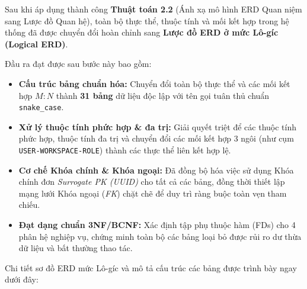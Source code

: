




Sau khi áp dụng thành công \textbf{Thuật toán 2.2} (Ánh xạ mô hình ERD Quan niệm sang Lược đồ Quan hệ), toàn bộ thực thể, thuộc tính và mối kết hợp trong hệ thống đã được chuyển đổi hoàn chỉnh sang \textbf{Lược đồ ERD ở mức Lô-gíc (Logical ERD)}.

Đầu ra đạt được sau bước này bao gồm:
\begin{itemize}
    \item \textbf{Cấu trúc bảng chuẩn hóa:} Chuyển đổi toàn bộ thực thể và các mối kết hợp $M:N$ thành \textbf{31 bảng} dữ liệu độc lập với tên gọi tuân thủ chuẩn \texttt{snake\_case}.
    \item \textbf{Xử lý thuộc tính phức hợp \& đa trị:} Giải quyết triệt để các thuộc tính phức hợp, thuộc tính đa trị và chuyển đổi các mối kết hợp 3 ngôi (như cụm \texttt{USER-WORKSPACE-ROLE}) thành các thực thể liên kết hợp lệ.
    \item \textbf{Cơ chế Khóa chính \& Khóa ngoại:} Đã đồng bộ hóa việc sử dụng Khóa chính đơn \textit{Surrogate PK (UUID)} cho tất cả các bảng, đồng thời thiết lập mạng lưới Khóa ngoại (\textit{FK}) chặt chẽ để duy trì ràng buộc toàn vẹn tham chiếu.
    \item \textbf{Đạt dạng chuẩn 3NF/BCNF:} Xác định tập phụ thuộc hàm (FDs) cho 4 phân hệ nghiệp vụ, chứng minh toàn bộ các bảng loại bỏ được rủi ro dư thừa dữ liệu và bất thường thao tác.
\end{itemize}

Chi tiết sơ đồ ERD mức Lô-gíc và mô tả cấu trúc các bảng được trình bày ngay dưới đây:
